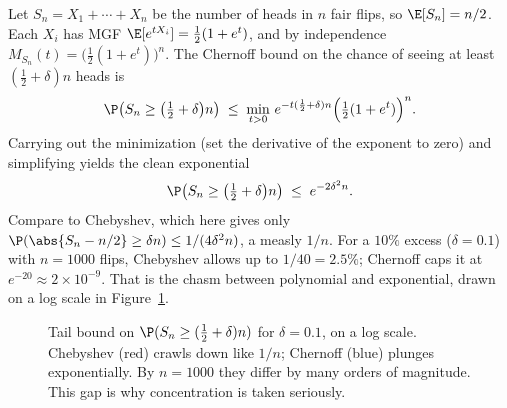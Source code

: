\begin{example}
\label{ch19:ex-chernoff-coins}
Let $S_n = X_1 + \cdots + X_n$ be the number of heads in $n$ fair flips, so
$\E[S_n] = n/2$. Each $X_i$ has MGF
$\E[e^{tX_i}] = \tfrac12(1 + e^{t})$, and by independence
$M_{S_n}(t) = \bigl(\tfrac12(1+e^t)\bigr)^n$. The Chernoff bound on the chance
of seeing at least $(\tfrac12 + \delta)n$ heads is
\[
  \P\!\left(S_n \ge \bigl(\tfrac12+\delta\bigr)n\right)
  \;\le\;
  \min_{t>0}\, e^{-t(\frac12+\delta)n}\Bigl(\tfrac12(1+e^t)\Bigr)^n .
\]
Carrying out the minimization (set the derivative of the exponent to zero) and
simplifying yields the clean exponential
\[
  \P\!\left(S_n \ge \bigl(\tfrac12+\delta\bigr)n\right)
  \;\le\; e^{-2\delta^2 n}.
\]
Compare to Chebyshev, which here gives only
$\P(\abs{S_n - n/2}\ge \delta n) \le 1/(4\delta^2 n)$, a measly $1/n$. For a
$10\%$ excess ($\delta = 0.1$) with $n = 1000$ flips, Chebyshev allows up to
$1/40 = 2.5\%$; Chernoff caps it at $e^{-20} \approx 2\times 10^{-9}$. That is
the chasm between polynomial and exponential, drawn on a log scale in
Figure~\ref{ch19:fig-chernoff-vs-cheb}.
\end{example}

\begin{figure}[H]
\centering
{}
\caption{Tail bound on $\P(S_n \ge (\tfrac12+\delta)n)$ for $\delta=0.1$, on a
log scale. Chebyshev (red) crawls down like $1/n$; Chernoff (blue) plunges
exponentially. By $n=1000$ they differ by many orders of magnitude. This gap
is why concentration is taken seriously.}
\label{ch19:fig-chernoff-vs-cheb}
\end{figure}

